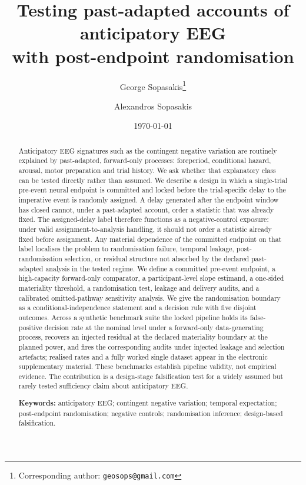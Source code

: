 \documentclass[11pt,a4paper]{article}
\title{\textbf{Testing past-adapted accounts of anticipatory EEG\\[4pt] with post-endpoint randomisation}}
\author[1]{George Sopasakis\thanks{Corresponding author:
           \texttt{geosops@gmail.com}}}
\author[2]{Alexandros Sopasakis}
\affil[1]{Research and Development Department, Ximantis AB, Onsala, Sweden}
\affil[2]{Department of Mathematics, Lund University, Lund, Sweden}
\date{\today}
\theoremstyle{definition}
\begin{document}
\maketitle

\begin{abstract}
\noindent
Anticipatory EEG signatures such as the contingent negative variation are
routinely explained by past-adapted, forward-only processes: foreperiod,
conditional hazard, arousal, motor preparation and trial history. We ask whether
that explanatory class can be tested directly rather than assumed. We describe a
design in which a single-trial pre-event neural endpoint is committed and locked
before the trial-specific delay to the imperative event is randomly assigned. A
delay generated after the endpoint window has closed cannot, under a past-adapted
account, order a statistic that was already fixed.
The assigned-delay label therefore functions as a negative-control exposure:
under valid assignment-to-analysis handling, it should not order a statistic
already fixed before assignment. Any material dependence of the committed
endpoint on that label localises the problem to randomisation failure, temporal
leakage, post-randomisation selection, or residual structure not absorbed by the
declared past-adapted analysis in the tested regime.
We define a committed pre-event endpoint, a high-capacity forward-only
comparator, a participant-level slope estimand, a one-sided materiality
threshold, a randomisation test, leakage and delivery audits, and a calibrated
omitted-pathway sensitivity analysis. We give the randomisation boundary as a
conditional-independence statement and a decision rule with five disjoint
outcomes. 
Across a synthetic benchmark suite the locked pipeline holds its false-positive
decision rate at the nominal level under a forward-only data-generating process,
recovers an injected residual at the declared materiality boundary at the planned
power, and fires the corresponding audits under injected leakage and selection
artefacts; realised rates and a fully worked single dataset appear in the
electronic supplementary material.
These benchmarks establish pipeline validity, not empirical evidence. The
contribution is a design-stage falsification test for a widely assumed but
rarely tested sufficiency claim about anticipatory EEG.

\medskip\noindent
\textbf{Keywords:} anticipatory EEG; contingent negative variation; temporal
expectation; post-endpoint randomisation; negative controls; randomisation
inference; design-based falsification.
\end{abstract}
\end{document}
